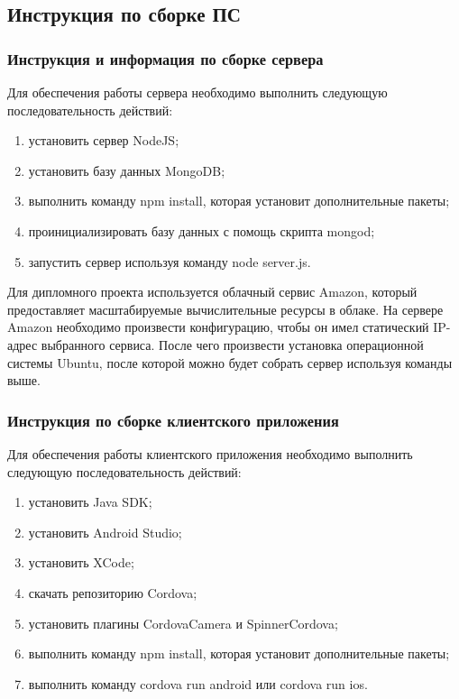 \subsection{Инструкция по сборке ПС}
\label{sub:arch_and_mod:sbor}

\subsubsection{Инструкция и информация по сборке сервера}

Для обеспечения работы сервера необходимо выполнить следующую последовательность действий:
\begin{enumerate}
\item установить сервер NodeJS;
\item установить базу данных MongoDB;
\item выполнить команду npm install, которая установит дополнительные пакеты;
\item проинициализировать базу данных с помощь скрипта mongod;
\item запустить сервер используя команду node server.js.
\end{enumerate}

Для дипломного проекта используется облачный сервис Amazon, который предоставляет масштабируемые вычислительные ресурсы в облаке. На сервере Amazon необходимо произвести конфигурацию, чтобы он имел статический IP-адрес выбранного сервиса. После чего произвести установка операционной системы Ubuntu, после которой можно будет собрать сервер используя команды выше.

\subsubsection{Инструкция по сборке клиентского приложения}

Для обеспечения работы клиентского приложения необходимо выполнить следующую последовательность действий:
\begin{enumerate}
\item установить Java SDK;
\item установить Android Studio;
\item установить XCode;
\item скачать репозиторию Cordova;
\item установить плагины CordovaCamera и SpinnerCordova;
\item выполнить команду npm install, которая установит дополнительные пакеты;
\item выполнить команду cordova run android или cordova run ios.
\end{enumerate}